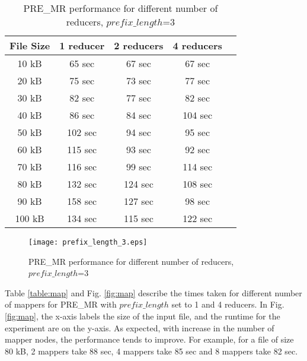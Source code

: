 \documentclass[conference]{IEEEtran}
\begin{document}
\begin{table}[htbp]
\caption{PRE\_MR performance for different number of reducers, $prefix\_length$=3}
\centering
\vspace{5pt}
\begin{tabular}{|c|c|c|c|c|}
\hline
\textbf{File Size} & \textbf{1 reducer} & \textbf{2 reducers} & \textbf{4 reducers}\\
\hline\hline
10 kB & 65 sec & 67 sec & 67 sec\\
\hline
20 kB & 75 sec & 73 sec & 77 sec \\
\hline
30 kB & 82 sec & 77 sec & 82 sec \\
\hline
40 kB & 86 sec & 84 sec & 104 sec \\
\hline
50 kB & 102 sec & 94 sec & 95 sec \\
\hline
60 kB & 115 sec & 93 sec & 92 sec \\
\hline
70 kB & 116 sec & 99 sec & 114 sec \\
\hline
80 kB & 132 sec & 124 sec & 108 sec \\
\hline
90 kB & 158 sec &  127 sec & 98 sec \\
\hline
100 kB & 134 sec & 115 sec & 122 sec  \\
\hline
\end{tabular}
\label{table:pl3}
\end{table}

\begin{figure}[htbp]
\begin{center}
\texttt{[image: prefix\_length\_3.eps]}
\end{center}
\caption{PRE\_MR performance for different number of reducers, $prefix\_length$=3}
\label{fig:pl3}
\end{figure}

Table \ref{table:map} and Fig. \ref{fig:map} describe the times taken for different number of mappers for PRE\_MR with $prefix\_length$ set to 1 and 4 reducers. In Fig. \ref{fig:map}, the x-axis labels the size of the input file, and the runtime for the experiment are on the y-axis. As expected, with increase in the number of mapper nodes, the performance tends to improve. For example, for a file of size 80 kB, 2 mappers take 88 sec, 4 mappers take 85 sec and 8 mappers take 82 sec.
\end{document}
